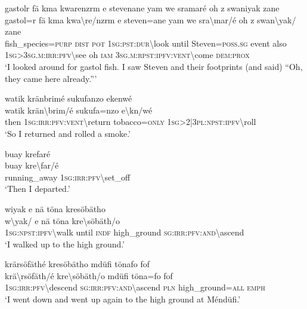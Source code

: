\ea\label{ex:13:a1339}
gastolr fä kma kwarenzrm e stevenane yam we sramaré oh z swaniyak zane\\
\gll gastol=r	fä	kma	kwa{\textbackslash}re/nzrm	e	steven=ane	yam	we	sra{\textbackslash}mar/é	oh	z	swan{\textbackslash}yak/	zane\\
     fish\_species=\textsc{purp}	\textsc{dist}	\textsc{pot}	1\textsc{sg}:\textsc{pst}:\textsc{dur}{\textbackslash}look	until	Steven=\textsc{poss}.\textsc{sg}	event	also	1\textsc{sg}>3\textsc{sg}.\textsc{m}:\textsc{irr}:\textsc{pfv}{\textbackslash}see	oh	\textsc{iam}	3\textsc{sg}.\textsc{m}:\textsc{rpst}:\textsc{ipfv}:\textsc{vent}{\textbackslash}come	\textsc{dem}:\textsc{prox}\\
\glt `I looked around for gastol fish. I saw Steven and their footprints (and said) ``Oh, they came here already.'''
\z

\ea\label{ex:13:a1340}
watik kränbrimé sukufanzo ekenwé\\
\gll watik	krän{\textbackslash}brim/é	sukufa=nzo	e{\textbackslash}kn/wé\\
     then	1\textsc{sg}:\textsc{irr}:\textsc{pfv}:\textsc{vent}{\textbackslash}return	tobacco=\textsc{only}	1\textsc{sg}>2|3\textsc{pl}:\textsc{npst}:\textsc{ipfv}{\textbackslash}roll\\
\glt `So I returned and rolled a smoke.'
\z

\ea\label{ex:13:a1341}
buay krefaré\\
\gll buay	kre{\textbackslash}far/é\\
     running\_away	1\textsc{sg}:\textsc{irr}:\textsc{pfv}{\textbackslash}set\_off\\
\glt `Then I departed.'
\z

\ea\label{ex:13:a1342}
wiyak e nä töna kresöbätho\\
\gll w{\textbackslash}yak/	e	nä	töna	kre{\textbackslash}söbäth/o\\
     1\textsc{sg}:\textsc{npst}:\textsc{ipfv}{\textbackslash}walk	until	\textsc{indf}	high\_ground	\textsc{sg}:\textsc{irr}:\textsc{pfv}:\textsc{and}{\textbackslash}ascend\\
\glt `I walked up to the high ground.'
\z

\ea\label{ex:13:a1343}
krärsöfäthé kresöbätho mdüfi tönafo fof\\
\gll krä{\textbackslash}rsöfäth/é	kre{\textbackslash}söbäth/o	mdüfi	töna=fo	fof\\
     1\textsc{sg}:\textsc{irr}:\textsc{pfv}{\textbackslash}descend	\textsc{sg}:\textsc{irr}:\textsc{pfv}:\textsc{and}{\textbackslash}ascend	\textsc{pln}	high\_ground=\textsc{all}	\textsc{emph}\\
\glt `I went down and went up again to the high ground at Méndüfi.'
\z

